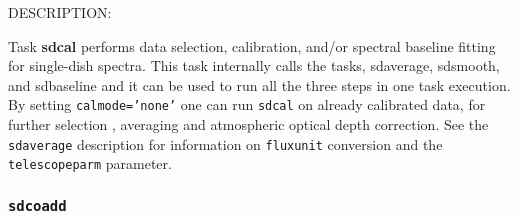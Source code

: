           DESCRIPTION:

          Task {\bf sdcal} performs data selection, calibration, and/or spectral
          baseline fitting for single-dish spectra. This task internally calls the
          tasks, sdaverage, sdsmooth, and sdbaseline and it can be used to run all the
          three steps in one task execution.
          By setting {\tt calmode='none'}
          one can run {\tt sdcal} on already calibrated data, for further selection
          , averaging and atmospheric optical depth correction.
          See the {\tt sdaverage} description for information on {\tt fluxunit} 
          conversion and the {\tt telescopeparm} parameter.
        

\subsubsection{{\tt sdcoadd}}
\label{section:sd.sdtasks.tasks.sdcoadd}


